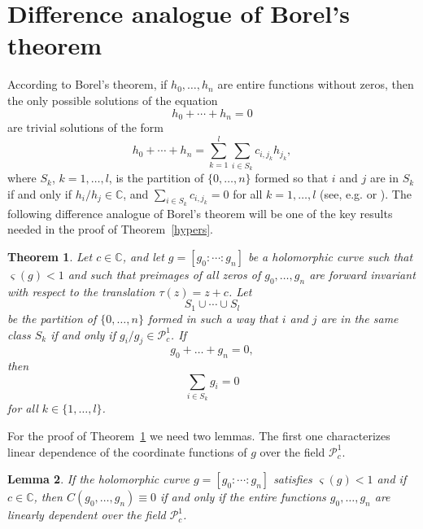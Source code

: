 \documentclass{amsart}
\newcommand{\C}{\mathbb{C}}
\newtheorem{theorem}{Theorem}%
\newtheorem{lemma}[theorem]{Lemma}
\theoremstyle{definition}
\numberwithin{equation}{section}
\numberwithin{theorem}{section}
\begin{document}
\section{Difference analogue of Borel's theorem}\label{borelsec}

According to Borel's theorem, if $h_0,\ldots,h_n$ are entire functions without zeros, then the only possible solutions of the equation
	\begin{equation}\label{boreleqh}
	h_0+\cdots+h_n=0
	\end{equation}
are trivial solutions of the form
	$$
	h_0+\cdots+h_n=\sum_{k=1}^l\sum_{i\in S_k} c_{i,j_k} h_{j_k},
	$$
where $S_k$, $k=1,\ldots,l$, is the partition of $\{0,\ldots,n\}$ formed so that $i$ and $j$ are in $S_k$ if and only if $h_i/h_j\in \C$, and  $\sum_{i\in S_k} c_{i,j_k}=0$ for all $k=1,\ldots,l$ (see, e.g. \cite[p.~186]{lang:87} or \cite[p.~124]{ru:01}). The following difference analogue of Borel's theorem will be one of the key results needed in the proof of Theorem~\ref{hypers}.

\begin{theorem}\label{borelanalogue}
Let $c\in\C$, and let $g=[g_0:\cdots:g_n]$ be a holomorphic curve such that $\varsigma(g)<1$ and such that preimages of all zeros of $g_0,\ldots,g_n$ are forward invariant with respect to the translation $\tau(z)=z+c$. Let
	\begin{equation*}
	S_1\cup\cdots\cup S_l
	\end{equation*}
be the partition of $\{0,\ldots,n\}$ formed in such a way that $i$ and $j$ are in the same class $S_k$ if and only if $g_i/g_j\in \mathcal{P}^1_c$. If
	\begin{equation}\label{boreleq}
	g_0+\ldots + g_n=0,
	\end{equation}
then
	\begin{equation*}
	\sum_{i\in S_k} g_i =0
	\end{equation*}
for all $k\in\{1,\ldots,l\}$.
\end{theorem}

For the proof of Theorem~\ref{borelanalogue} we need two lemmas. The first one characterizes linear dependence of the coordinate functions of $g$ over the field $\mathcal{P}^1_c$.

\begin{lemma}\label{casoratilemma}
If the holomorphic curve $g=[g_0:\cdots:g_n]$ satisfies $\varsigma(g)<1$ and if $c\in\C$, then $C(g_0,\ldots,g_n)\equiv 0$ if and only if the entire functions $g_0,\ldots,g_n$ are linearly dependent over the field $\mathcal{P}^1_c$.
\end{lemma}
\end{document}

